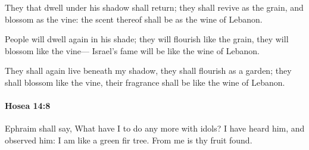 			\begin{versebox}
					\item[BHS] 
					\item[LXX] 
					\item[ASV] They that dwell under his shadow shall return; they shall revive as the grain, and blossom as the vine: the scent thereof shall be as the wine of Lebanon.
					\item[NIV] People will dwell again in his shade; they will flourish like the grain, they will blossom like the vine— Israel’s fame will be like the wine of Lebanon.
					\item[NRSV] They shall again live beneath my shadow, they shall flourish as a garden; they shall blossom like the vine, their fragrance shall be like the wine of Lebanon.
			\end{versebox}

		\paragraph{Hosea 14:8} %
			\label{HOSEA-14-8}

			Ephraim shall say, What have I to do any more with idols? I have heard him, and observed him: I am like a green fir tree. From me is thy fruit found.


